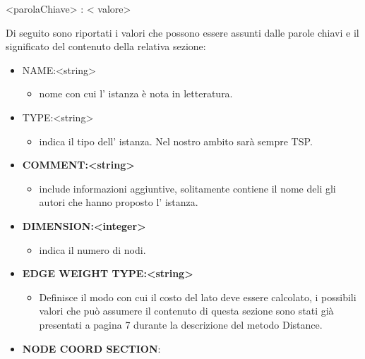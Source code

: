 \documentclass[11pt]{article}
\begin{document}
\begin{center}
<parolaChiave> : < valore> 
\end{center}

Di seguito sono riportati i valori che possono essere assunti dalle parole chiavi e il significato del contenuto della relativa sezione: 

\begin{itemize}
    \item NAME:<string> 
    \begin{itemize}
    \item nome con cui l' istanza è nota in letteratura.
    \end{itemize}
    \item TYPE:<string>
    
    \begin{itemize}     
    \item indica il tipo dell' istanza. Nel nostro ambito sarà sempre TSP.    
    \end{itemize}    
     
    \item \textbf{COMMENT:<string>} 
    \begin{itemize}    
    \item include informazioni aggiuntive, solitamente contiene il nome deli gli autori che hanno proposto l'                  istanza.
    \end{itemize}    
    
        
    \item \textbf{DIMENSION:<integer>} 
    \begin{itemize}
    \item indica il numero di nodi.
    \end{itemize}    
    
    \item \textbf{EDGE WEIGHT TYPE:<string>}
    \begin{itemize} 
    \item Definisce il modo con cui il costo del lato deve essere calcolato, i possibili valori  che può assumere                 il contenuto di questa sezione sono stati già presentati a pagina 7 durante la descrizione del metodo Distance.
    \end{itemize}    
    
    \item \textbf{NODE COORD SECTION}: 
    \begin{itemize}    
    

\end{itemize}
\end{itemize}
\end{document}
